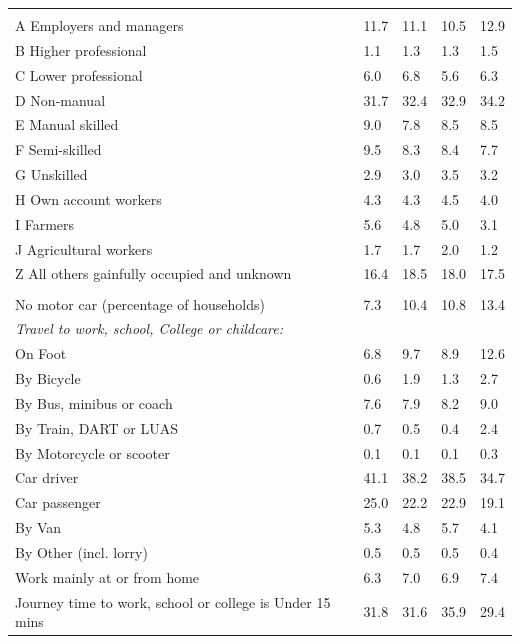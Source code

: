 \documentclass{article}
\begin{document}
\begin{table}[h]
\begin{tabular}{KTTTT}
\hline
    \\ 
    \hline
A Employers and managers & 11.7& 11.1& 10.5& 12.9\\
B Higher professional & 1.1& 1.3& 1.3& 1.5\\
C Lower professional & 6.0& 6.8& 5.6& 6.3\\
D Non-manual & 31.7& 32.4& 32.9& 34.2\\
E Manual skilled & 9.0& 7.8& 8.5& 8.5\\
F Semi-skilled & 9.5& 8.3& 8.4& 7.7\\
G Unskilled & 2.9& 3.0& 3.5& 3.2\\
H Own account workers & 4.3& 4.3& 4.5& 4.0\\
I Farmers & 5.6& 4.8& 5.0& 3.1\\
J Agricultural workers & 1.7& 1.7& 2.0& 1.2\\
Z All others gainfully occupied and unknown & 16.4& 18.5& 18.0& 17.5\\
\hline
{}\hline
    \\ 
    \hline
No motor car (percentage of households) &  7.3& 10.4& 10.8& 
13.4\\
    \hline 
\emph{Travel to work, school, College or childcare:} & & & \\
\quad On Foot &  6.8&  9.7&  8.9& 12.6\\ 
\quad By Bicycle & 0.6& 1.9& 1.3& 2.7\\ 
\quad By Bus, minibus or coach & 7.6& 7.9& 8.2& 9.0\\
\quad By Train, DART or LUAS & 0.7& 0.5& 0.4& 2.4\\
\quad By Motorcycle or scooter & 0.1& 0.1& 0.1& 0.3\\
\quad Car driver & 41.1 & 38.2& 38.5& 34.7\\
\quad Car passenger & 25.0& 22.2& 22.9& 19.1\\
\quad By Van & 5.3& 4.8& 5.7& 4.1\\
\quad By Other (incl. lorry) & 0.5& 0.5& 0.5& 0.4\\
    \hline
Work mainly at or from home & 6.3& 7.0& 6.9& 7.4\\
Journey time to work, school or college is Under 15 mins & 31.8& 31.6& 35.9& 29.4\\

\end{tabular}
\end{table}
\end{document}
